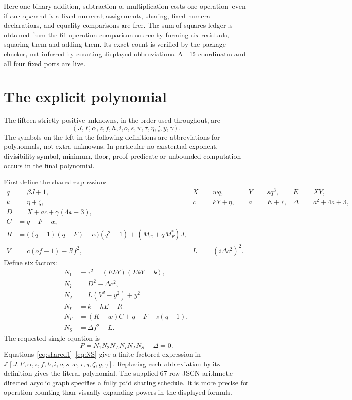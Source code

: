 \documentclass[11pt]{article}
\newcommand{\Z}{\mathbb Z}
\begin{document}
Here one binary addition, subtraction or multiplication costs one operation, even if one operand is a fixed numeral; assignments, sharing, fixed numeral declarations, and equality comparisons are free. The sum-of-squares ledger is obtained from the 61-operation comparison source by forming six residuals, squaring them and adding them. Its exact count is verified by the package checker, not inferred by counting displayed abbreviations. All 15 coordinates and all four fixed ports are live.

\section{The explicit polynomial}\label{sec:poly}

The fifteen strictly positive unknowns, in the order used throughout, are
\[
(J,F,\alpha,z,f,h,i,o,s,w,\tau,\eta,\zeta,y,\gamma).
\]
The symbols on the left in the following definitions are abbreviations for polynomials, not extra unknowns. In particular no existential exponent, divisibility symbol, minimum, floor, proof predicate or unbounded computation occurs in the final polynomial.

First define the shared expressions
\begin{align}
 q&=\beta J+1,& X&=wq,&Y&=sq^3,&E&=XY,\label{eq:shared1}\\
 k&=\eta+\zeta,&c&=kY+\eta,&a&=E+Y,&\Delta&=a^2+4a+3,\label{eq:shared2}\\
 D&=X+ac+\gamma(4a+3),\label{eq:D}\\
 C&=q-F-\alpha,\label{eq:C}\\
 R&=\bigl((q-1)(q-F)+\alpha\bigr)(q^2-1)+(M_C+qM_F^*)J,\label{eq:R}\\
 V&=c(of-1)-Rf^2,&L&=(i\Delta c^2)^2.\label{eq:aux}
\end{align}
Define six factors:
\begin{align}
 N_1&=\tau^2-(EkY)(EkY+k),\label{eq:N1}\\
 N_2&=D^2-\Delta c^2,\label{eq:N2}\\
 N_A&=L(V^2-y^2)+y^2,\label{eq:NA}\\
 N_I&=k-hE-R,\label{eq:NI}\\
 N_T&=(K+w)C+q-F-z(q-1),\label{eq:NT}\\
 N_S&=\Delta f^2-L.\label{eq:NS}
\end{align}
The requested single equation is
\begin{equation}\label{eq:P}
\boxed{\quad P=N_1N_2N_AN_IN_TN_S-\Delta=0.\quad}
\end{equation}
Equations~\eqref{eq:shared1}--\eqref{eq:NS} give a finite factored expression in \(\Z[J,F,\alpha,z,f,h,i,o,s,w,\tau,\eta,\zeta,y,\gamma]\). Replacing each abbreviation by its definition gives the literal polynomial. The supplied 67-row JSON arithmetic directed acyclic graph specifies a fully paid sharing schedule. It is more precise for operation counting than visually expanding powers in the displayed formula.
\end{document}

